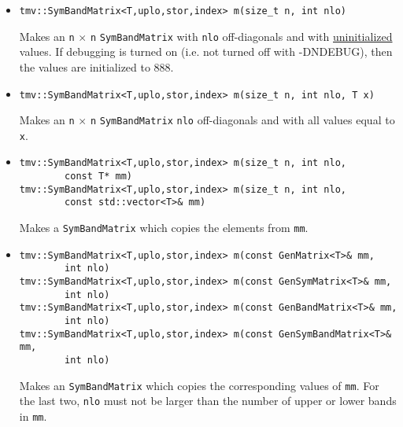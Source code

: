 \documentclass[twoside,letterpaper,11pt]{article}
\renewcommand{\tt}[1]{{\texttt {#1}}}
\begin{document}
\begin{itemize}
\item 
\begin{verbatim}
tmv::SymBandMatrix<T,uplo,stor,index> m(size_t n, int nlo)
\end{verbatim}
Makes an \tt{n} $\times$ \tt{n} \tt{SymBandMatrix} with 
\tt{nlo} off-diagonals
and with \underline{uninitialized} values.
If debugging is turned on (i.e. not turned off 
with -DNDEBUG), then the values are initialized to 888.

\item
\begin{verbatim}
tmv::SymBandMatrix<T,uplo,stor,index> m(size_t n, int nlo, T x)
\end{verbatim}
Makes an \tt{n} $\times$ \tt{n} \tt{SymBandMatrix} \tt{nlo} off-diagonals
and with all values equal to \tt{x}.

\item
\begin{verbatim}
tmv::SymBandMatrix<T,uplo,stor,index> m(size_t n, int nlo, 
        const T* mm)
tmv::SymBandMatrix<T,uplo,stor,index> m(size_t n, int nlo, 
        const std::vector<T>& mm)
\end{verbatim}
Makes a \tt{SymBandMatrix} which copies the elements from \tt{mm}.  

\item 
\begin{verbatim}
tmv::SymBandMatrix<T,uplo,stor,index> m(const GenMatrix<T>& mm, 
        int nlo)
tmv::SymBandMatrix<T,uplo,stor,index> m(const GenSymMatrix<T>& mm, 
        int nlo)
tmv::SymBandMatrix<T,uplo,stor,index> m(const GenBandMatrix<T>& mm, 
        int nlo)
tmv::SymBandMatrix<T,uplo,stor,index> m(const GenSymBandMatrix<T>& mm, 
        int nlo)
\end{verbatim}
Makes an \tt{SymBandMatrix} which copies the corresponding values of \tt{mm}.  
For the last two, \tt{nlo} must not be larger than the number of upper
or lower bands in \tt{mm}.


\end{itemize}
\end{document}
